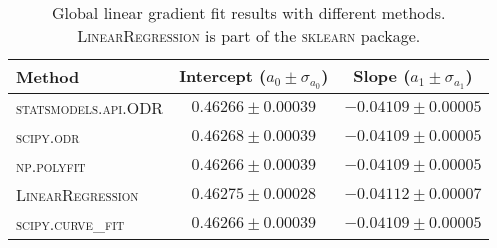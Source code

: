 
\begin{table}
\caption{Global linear gradient fit results with different methods. \textsc{LinearRegression} is part of the \textsc{sklearn} package.}
\label{tab:global_fit_results_per_method}
\begin{tabularx}{\columnwidth}{lCC}
\hline
Method & Intercept ($a_0 \pm \sigma_{a_0}$) & Slope ($a_1 \pm \sigma_{a_1}$) \\
\hline
\textsc{statsmodels.api.ODR} & $0.46266 \pm 0.00039$ & $-0.04109 \pm 0.00005$ \\
\textsc{scipy.odr} & $0.46268 \pm 0.00039$ & $-0.04109 \pm 0.00005$ \\
\textsc{np.polyfit} & $0.46266 \pm 0.00039$ & $-0.04109 \pm 0.00005$ \\
\textsc{LinearRegression} & $0.46275 \pm 0.00028$ & $-0.04112 \pm 0.00007$ \\
\textsc{scipy.curve\_fit} & $0.46266 \pm 0.00039$ & $-0.04109 \pm 0.00005$ \\
\hline
\end{tabularx}
\end{table}
